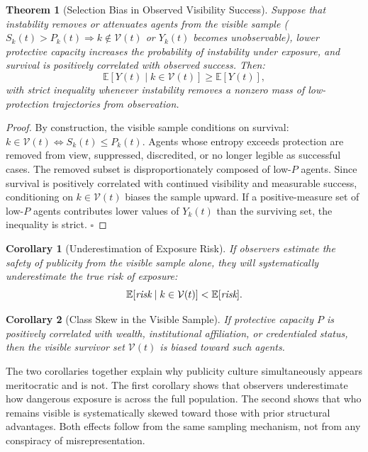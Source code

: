 \documentclass[12pt,a4paper]{article}
\newtheorem{theorem}{Theorem}
\newtheorem{corollary}{Corollary}[theorem]
\begin{document}
\begin{theorem}[Selection Bias in Observed Visibility Success]
Suppose that instability removes or attenuates agents from the visible sample ($S_k(t) > P_k(t) \Rightarrow k \notin \mathcal{V}(t)$ or $Y_k(t)$ becomes unobservable), lower protective capacity increases the probability of instability under exposure, and survival is positively correlated with observed success. Then:
\[
\mathbb{E}[Y(t)\mid k\in \mathcal{V}(t)] \geq \mathbb{E}[Y(t)],
\]
with strict inequality whenever instability removes a nonzero mass of low-protection trajectories from observation.
\end{theorem}

\begin{proof}
By construction, the visible sample conditions on survival: $k\in \mathcal{V}(t) \iff S_k(t)\leq P_k(t)$. Agents whose entropy exceeds protection are removed from view, suppressed, discredited, or no longer legible as successful cases. The removed subset is disproportionately composed of low-$P$ agents. Since survival is positively correlated with continued visibility and measurable success, conditioning on $k\in \mathcal{V}(t)$ biases the sample upward. If a positive-measure set of low-$P$ agents contributes lower values of $Y_k(t)$ than the surviving set, the inequality is strict. \hfill$\square$
\end{proof}

\begin{corollary}[Underestimation of Exposure Risk]
If observers estimate the safety of publicity from the visible sample alone, they will systematically underestimate the true risk of exposure:
\[
\mathbb{E}[\emph{risk} \mid k\in \mathcal{V}(t)] < \mathbb{E}[\emph{risk}].
\]
\end{corollary}

\begin{corollary}[Class Skew in the Visible Sample]
If protective capacity $P$ is positively correlated with wealth, institutional affiliation, or credentialed status, then the visible survivor set $\mathcal{V}(t)$ is biased toward such agents.
\end{corollary}

The two corollaries together explain why publicity culture simultaneously appears meritocratic and is not. The first corollary shows that observers underestimate how dangerous exposure is across the full population. The second shows that who remains visible is systematically skewed toward those with prior structural advantages. Both effects follow from the same sampling mechanism, not from any conspiracy of misrepresentation.
\end{document}
